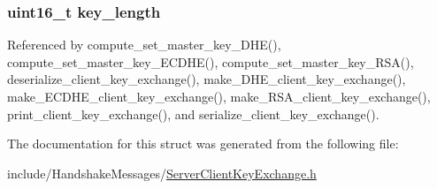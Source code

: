\subsubsection[{\texorpdfstring{key\+\_\+length}{key_length}}]{\setlength{\rightskip}{0pt plus 5cm}uint16\+\_\+t key\+\_\+length}\hypertarget{structclient__key__exchange__t_aaca3c65525352f552124c3d947b60dcb}{}\label{structclient__key__exchange__t_aaca3c65525352f552124c3d947b60dcb}


Referenced by compute\+\_\+set\+\_\+master\+\_\+key\+\_\+\+D\+H\+E(), compute\+\_\+set\+\_\+master\+\_\+key\+\_\+\+E\+C\+D\+H\+E(), compute\+\_\+set\+\_\+master\+\_\+key\+\_\+\+R\+S\+A(), deserialize\+\_\+client\+\_\+key\+\_\+exchange(), make\+\_\+\+D\+H\+E\+\_\+client\+\_\+key\+\_\+exchange(), make\+\_\+\+E\+C\+D\+H\+E\+\_\+client\+\_\+key\+\_\+exchange(), make\+\_\+\+R\+S\+A\+\_\+client\+\_\+key\+\_\+exchange(), print\+\_\+client\+\_\+key\+\_\+exchange(), and serialize\+\_\+client\+\_\+key\+\_\+exchange().



The documentation for this struct was generated from the following file\+:\begin{DoxyCompactItemize}
\item 
include/\+Handshake\+Messages/\hyperlink{_server_client_key_exchange_8h}{Server\+Client\+Key\+Exchange.\+h}\end{DoxyCompactItemize}
